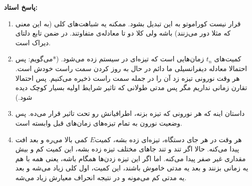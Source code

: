 \documentclass[12pt,onecolumn,a4paper]{article}
\begin{document}
\textbf{پاسخ استاد:}
\begin{enumerate}
\item
قرار نیست کوراموتو به این تبدیل بشود. ممکنه یه شباهت‌های کلی‌ (به این معنی که مثلا دور می‌زنند) باشه ولی کلا دو تا معادله‌ی متفاوتند. در ضمن تابع دلتای دیراک است.
\item
کمیت‌های $t_n$ زمان‌هایی است که تیزه‌ای در سیستم زده می‌شود. (*می‌گویم: پس احتمالا معادله دیفرانسیلی ما دائم در حال به روز کردن سمت راست خودش است. هر وقت نورونی تیزه زد آن را در جمله سمت راست ذخیره می‌کنیم. پس احتمالا تقارن زمانی نداریم مگر پس مدتی طولانی که تاثیر شرایط اولیه بسیار کوچک دیده شود.)
\item
داستان اینه که هر نورونی که تیزه بزنه، اطرافیانش رو تحت تاثیر قرار می‌ده. پس وضعیت نورون به تمام تیزه‌های زمان‌های قبل وابسته است.
\item
هر وقت در هر جای دستگاه، تیزه‌ای زده بشه، کمیت$E$ کمی بالا می‌ره و بعد افت پیدا می‌کنه. حالا اگر تند و تند جا‌های مختلف تیزه زده بشه، این کمیت کم و بیش مقداری غیر صفر پیدا می‌کنه. اما اگر این تیزه زدن‌ها همگام باشه، یعنی همه با هم یه زمانی بزنند و بعد یه مدتی خاموش باشند، این کمیت، اول کلی زیاد می‌شه و بعد یه مدتی کم می‌مونه و در نتیجه انحراف معیارش زیاد می‌شه.
\end{enumerate}



\end{document}
